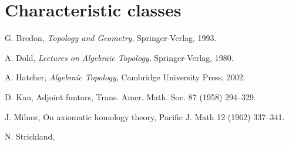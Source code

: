\documentclass[11pt]{memoir}
\begin{document}
\chapter{Characteristic classes}






\backmatter

\nocite{*}

\begin{thebibliography}{9}


G. Bredon, {\em Topology and Geometry}, Springer-Verlag, 1993.

A. Dold,
{\em Lectures on Algebraic Topology},
Springer-Verlag, 1980.

A. Hatcher,
{\em Algebraic Topology}, Cambridge University Press, 2002.

D. Kan,
Adjoint funtors,
Trans. Amer. Math. Soc. 87 (1958) 294--329.

J. Milnor,
On axiomatic homology theory,
Pacific J. Math 12 (1962) 337--341.

N. Strickland,



\end{thebibliography}
\end{document}
